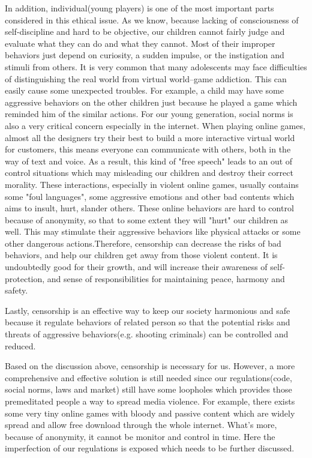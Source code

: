 In addition, individual(young players) is one of the most important parts considered in this ethical issue. As we know, because lacking of consciousness of self-discipline and hard to be objective, our children cannot fairly judge and evaluate what they can do and what they cannot. Most of their improper behaviors just depend on curiosity,  a sudden impulse, or the instigation and stimuli from others. It is very common that many adolescents may face difficulties of distinguishing the real world from virtual world--game addiction. This can easily cause some unexpected troubles. For example, a child may have some aggressive behaviors on the other children just because he played a game which reminded him of the similar actions. For our young generation, social norms is also a very critical concern especially in the internet. When playing online games, almost all the designers try their best to build a more interactive virtual world for customers, this means everyone can communicate with others, both in the way of text and voice. As a result, this kind of "free speech" leads to an out of control situations which may misleading our children and destroy their correct morality. These interactions, especially in violent online games, usually contains some "foul languages", some aggressive emotions and other bad contents which aims to insult, hurt, slander others. These online behaviors are hard to control because of anonymity, so that to some extent they will "hurt" our children as well. This may stimulate their aggressive behaviors like physical attacks or some other dangerous actions.Therefore, censorship can decrease the risks of bad behaviors, and help our children get away from those violent content. It is undoubtedly good for their growth, and will increase their awareness of self-protection, and sense of responsibilities for  maintaining peace, harmony and safety.

Lastly, censorship is an effective way to keep our society harmonious and safe because it regulate behaviors of related person so that the potential risks and threats of aggressive behaviors(e.g. shooting criminals) can be controlled and reduced.

Based on the discussion above, censorship is necessary for us. However, a more comprehensive and effective solution is still needed since our regulations(code, social norms, laws and market) still have some loopholes which provides those premeditated people a way to spread media violence. For example, there exists some very tiny online games with bloody and passive content which are widely spread and allow free download through the whole internet. What's more, because of anonymity, it cannot be monitor and control in time. Here the imperfection of our regulations is exposed which needs to be further discussed.









